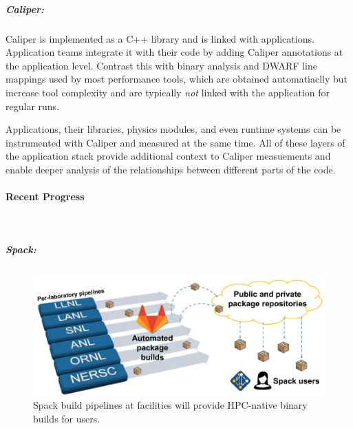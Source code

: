 \subparagraph{Caliper:}
Caliper is implemented as a C++ library and is linked with applications.
Application teams integrate it with their code by adding Caliper
annotations at the application level.  Contrast this with binary analysis
and DWARF line mappings used by most performance tools, which are
obtained automatiaclly but increase tool complexity and are typically
{\it not} linked with the application for regular runs.

Applications, their libraries, physics modules, and even runtime systems
can be instrumented with Caliper and measured at the same time.  All of
these layers of the application stack provide additional context to
Caliper measuements and enable deeper analysis of the relationships
between different parts of the code.



\paragraph{Recent Progress} \leavevmode \\


\subparagraph{Spack:}
\begin{figure}[tb]
\centering
\includegraphics[width=.75\textwidth]{projects/2.3.6-NNSA/2.3.6.02-LLNL-ATDM/spack-pipelines.pdf}
\caption{Spack build pipelines at facilities will provide HPC-native binary builds for users.}
\end{figure}


